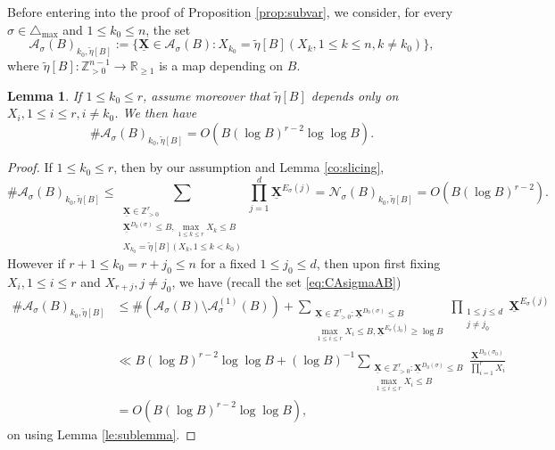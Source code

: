 \documentclass[11pt,letterpaper]{amsart}
\newcommand{\BR}{{\mathbb {R}}}
\newcommand{\BZ}{{\mathbb {Z}}}
\newcommand{\CA}{{\mathcal {A}}}
\newcommand{\CN}{{\mathcal {N}}}
\newcommand{\XX}{\underline{\mathbf{X}}}
\theoremstyle{plain}
\numberwithin{equation}{section}
\newtheorem{lemma}[theorem]{Lemma}
\theoremstyle{definition}
\theoremstyle{remark}
\begin{document}
Before entering into the proof of Proposition \ref{prop:subvar}, we consider, for every $\sigma\in\triangle_{\max}$ and $1\leqslant k_0\leqslant n$, the set \begin{equation}\label{eq:CABik}
	\CA_\sigma(B)_{k_0,\widetilde{\eta}[B]}:=\{\XX\in\CA_\sigma(B):X_{k_0}=\widetilde{\eta}[B](X_k,1\leqslant k\leqslant n,k\neq k_0)\},
\end{equation} where $\widetilde{\eta}[B]:\BZ_{>0}^{n-1}\to\BR_{\geqslant 1}$ is a map depending on $B$.
\begin{lemma}\label{le:CABik}
		If $1\leqslant k_0\leqslant r$, assume moreover that $\widetilde{\eta}[B]$ depends only on $X_i,1\leqslant i\leqslant r,i\neq k_0$. We then have $$\#\CA_\sigma(B)_{k_0,\widetilde{\eta}[B]}=O(B(\log B)^{r-2}\log\log B).$$
\end{lemma}
\begin{proof}
	If $1\leqslant k_0\leqslant r$, then by our assumption and Lemma \ref{co:slicing}, $$\#\CA_{\sigma}(B)_{k_0,\widetilde{\eta}[B]}\leqslant\sum_{\substack{\XX\in\BZ_{>0}^r\\ \XX^{D_0(\sigma)}\leqslant B,\max_{1\leqslant k\leqslant r} X_k\leqslant B\\ X_{k_0}=\widetilde{\eta}[B](X_k,1\leqslant k< k_0)}}\prod_{j=1}^d\XX^{E_\sigma(j)}= \CN_{\sigma}(B)_{k_0,\widetilde{\eta}[B]}=O(B(\log B)^{r-2}).$$ However if $r+1\leqslant k_0=r+j_0\leqslant n$ for a fixed $1\leqslant j_0\leqslant d$, then upon first fixing $X_i,1\leqslant i\leqslant r$ and $X_{r+j},j\neq j_0$, we have (recall the set \eqref{eq:CAsigmaAB})
	\begin{align*}
		\#\CA_{\sigma}(B)_{k_0,\widetilde{\eta}[B]}&\leqslant \#(\CA_\sigma(B)\setminus \CA_\sigma^{(1)}(B))+ \sum_{\substack{\XX\in\BZ_{>0}^r:\XX^{D_0(\sigma)}\leqslant B\\ \max_{1\leqslant i\leqslant r}X_i\leqslant B,\XX^{E_{\sigma}(j_0)}\geqslant \log B}}\prod_{\substack{1\leqslant j\leqslant d\\ j\neq j_0}}\XX^{E_{\sigma}(j)}\\ &\ll B(\log B)^{r-2}\log\log B+(\log B)^{-1}\sum_{\substack{\XX\in\BZ_{>0}^r:\XX^{D_0(\sigma)}\leqslant B\\ \max_{1\leqslant i\leqslant r}X_i\leqslant B}}\frac{\XX^{D_0(\sigma_0)}}{\prod_{i=1}^{r}X_i}\\&=O(B(\log B)^{r-2}\log\log B),
	\end{align*} on using Lemma \ref{le:sublemma}.
\end{proof}
\end{document}
